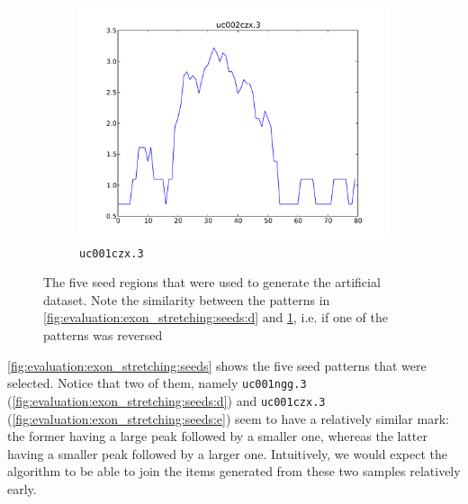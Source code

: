 \documentclass[parskip]{cs4rep}
\newcommand{\gene}[1]{{\tt #1}}
\begin{document}
\begin{figure}[t,b]
\begin{subfigure}[b]{0.3\textwidth}
        \centering
        \includegraphics[width=\textwidth]{figures/evaluation/exon_stretching/uc002czx_3.pdf}
        \caption{\gene{uc001czx.3}}
        \label{fig:evaluation:exon_stretching:seeds:e}
    \end{subfigure}
    \caption{The five seed regions that were used to generate the artificial dataset. Note the similarity between the patterns in \ref{fig:evaluation:exon_stretching:seeds:d} and \ref{fig:evaluation:exon_stretching:seeds:e}, i.e. if one of the patterns was reversed}
    \label{fig:evaluation:exon_stretching:seeds}
\end{figure}

\autoref{fig:evaluation:exon_stretching:seeds} shows the five seed patterns that were selected. 
Notice that two of them, namely \gene{uc001ngg.3} (\autoref{fig:evaluation:exon_stretching:seeds:d}) and \gene{uc001czx.3} (\autoref{fig:evaluation:exon_stretching:seeds:e}) seem to have a relatively similar mark: the former having a large peak followed by a smaller one, whereas the latter having a smaller peak followed by a larger one. Intuitively, we would expect the algorithm to be able to join the items generated from these two samples relatively early.
\end{document}
